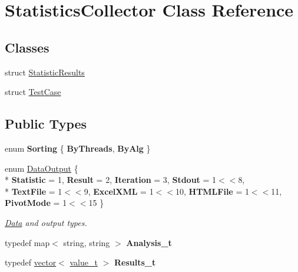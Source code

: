 \hypertarget{classStatisticsCollector}{}\section{Statistics\+Collector Class Reference}
\label{classStatisticsCollector}
\subsection*{Classes}
\begin{DoxyCompactItemize}
\item 
struct \hyperlink{structStatisticsCollector_1_1StatisticResults}{Statistic\+Results}
\item 
struct \hyperlink{structStatisticsCollector_1_1TestCase}{Test\+Case}
\end{DoxyCompactItemize}
\subsection*{Public Types}
\begin{DoxyCompactItemize}
\item 
\hypertarget{classStatisticsCollector_a428ba472038844565822a1dfbec05dc6}{}enum {\bfseries Sorting} \{ {\bfseries By\+Threads}, 
{\bfseries By\+Alg}
 \}\label{classStatisticsCollector_a428ba472038844565822a1dfbec05dc6}

\item 
\hypertarget{classStatisticsCollector_a90894ad6988fe40d2eb6f8a7e18d5813}{}enum \hyperlink{classStatisticsCollector_a90894ad6988fe40d2eb6f8a7e18d5813}{Data\+Output} \{ \\*
{\bfseries Statistic} = 1, 
{\bfseries Result} = 2, 
{\bfseries Iteration} = 3, 
{\bfseries Stdout} = 1$<$$<$8, 
\\*
{\bfseries Text\+File} = 1$<$$<$9, 
{\bfseries Excel\+X\+M\+L} = 1$<$$<$10, 
{\bfseries H\+T\+M\+L\+File} = 1$<$$<$11, 
{\bfseries Pivot\+Mode} = 1$<$$<$15
 \}\label{classStatisticsCollector_a90894ad6988fe40d2eb6f8a7e18d5813}
\begin{DoxyCompactList}\small\item\em \hyperlink{classData}{Data} and output types. \end{DoxyCompactList}
\item 
\hypertarget{classStatisticsCollector_a6271f71bcc8fbc85105fdeacaebb2c0a}{}typedef map$<$ string, string $>$ {\bfseries Analysis\+\_\+t}\label{classStatisticsCollector_a6271f71bcc8fbc85105fdeacaebb2c0a}

\item 
\hypertarget{classStatisticsCollector_ad2585acea4faeed05e88bb72d92adee4}{}typedef \hyperlink{structvector}{vector}$<$ \hyperlink{classvalue__t}{value\+\_\+t} $>$ {\bfseries Results\+\_\+t}\label{classStatisticsCollector_ad2585acea4faeed05e88bb72d92adee4}

\end{DoxyCompactItemize}
